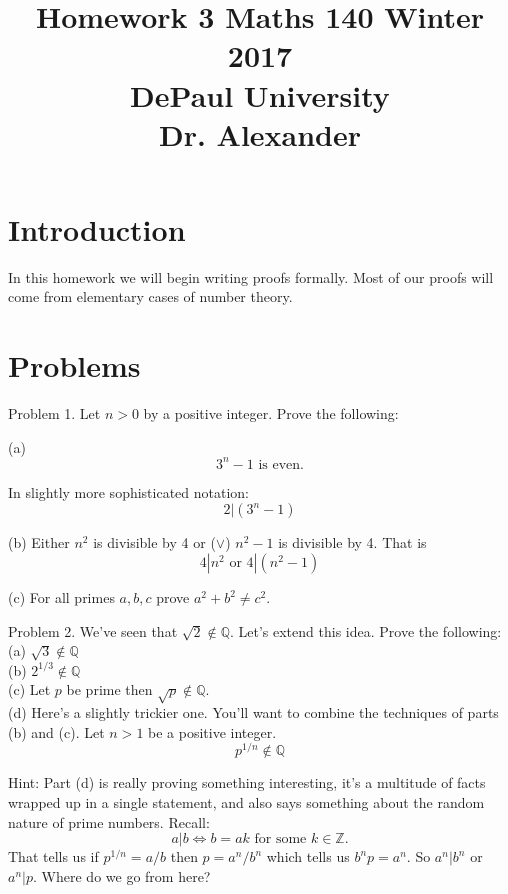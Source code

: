 \documentclass[16 pt]{amsart}
\theoremstyle{definition}
\theoremstyle{remark}
\numberwithin{equation}{subsection}
\newcommand{\Z}{\mathbb{Z}}
\newcommand{\Q}{\mathbb{Q}}
\begin{document}
\title{Homework 3 Maths 140 Winter 2017 \\ DePaul University\\Dr. Alexander}
\maketitle

\section{Introduction}

In this homework we will begin writing proofs formally. Most of our proofs will come from elementary cases of number theory.


\section{Problems}

Problem 1. Let $n>0$ by a positive integer.  Prove the following:

(a)
\[
3^n - 1 \text{ is even.}
\]

In slightly more sophisticated notation:
\[
2 | (3^n-1)
\]

(b) Either $n^2$ is divisible by 4 or ($\vee$)  $n^2-1$ is divisible by 4.  That is
\[
4 | n^2 \text{ or } 4|(n^2-1)
\]

(c) For all primes $a,b,c$ prove $a^2+b^2 \neq c^2.$

\newpage

Problem 2. We've seen that $\sqrt{2}\notin\Q$.  Let's extend this idea.  Prove the following:\\

(a) $\sqrt{3}\notin \Q$\\

(b) $2^{1/3} \notin \Q$\\

(c) Let $p$ be prime then $\sqrt{p}\notin\Q$.\\

(d) Here's a slightly trickier one.  You'll want to combine the techniques of parts (b) and (c). Let $n>1$ be a positive integer.
\[
p^{1/n} \notin \Q
\]

Hint: Part (d) is really proving something interesting, it's a multitude of facts wrapped up in a single statement, and also says something about the random nature of prime numbers.  Recall:
\[
a|b \iff b = ak \text{ for some } k\in\Z.
\]
That tells us if $p^{1/n} = a/b$ then $p = a^n/b^n$ which tells us $b^n p = a^n$.  So $a^n | b^n$ or $a^n | p$.  Where do we go from here?
\end{document}
